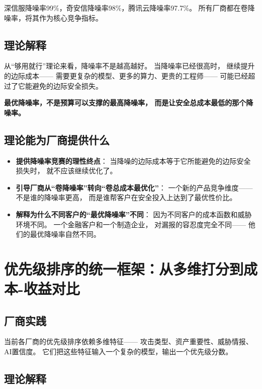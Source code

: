 \documentclass[11pt,a4paper]{article}
\begin{document}
深信服降噪率99\%，奇安信降噪率98\%，腾讯云降噪率97.7\%。
所有厂商都在卷降噪率，将其作为核心竞争指标。

\subsection{理论解释}

从“够用就行”理论来看，降噪率不是越高越好。
当降噪率已经很高时，
继续提升的边际成本——
需要更复杂的模型、更多的算力、更贵的工程师——
可能已经超过了它能避免的边际安全损失。

\textbf{最优降噪率，不是预算可以支撑的最高降噪率，
而是让安全总成本最低的那个降噪率。}

\subsection{理论能为厂商提供什么}

\begin{itemize}
    \item \textbf{提供降噪率竞赛的理性终点}：
          当降噪的边际成本等于它所能避免的边际安全损失时，
          就不应该继续优化了。
    \item \textbf{引导厂商从“卷降噪率”转向“卷总成本最优化”}：
          一个新的产品竞争维度——
          不是谁的降噪率更高，
          而是谁帮客户在安全投入上达到了最优性价比。
    \item \textbf{解释为什么不同客户的“最优降噪率”不同}：
          因为不同客户的成本函数和威胁环境不同。
          一个金融客户和一个制造企业，
          对漏报的容忍度完全不同——
          他们的最优降噪率自然不同。
\end{itemize}

\section{优先级排序的统一框架：从多维打分到成本-收益对比}

\subsection{厂商实践}

当前各厂商的优先级排序依赖多维特征——
攻击类型、资产重要性、威胁情报、AI置信度。
它们把这些特征输入一个复杂的模型，输出一个优先级分数。

\subsection{理论解释}
\end{document}
